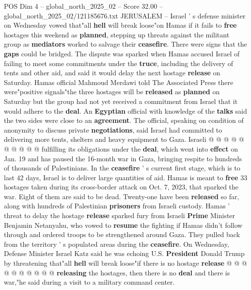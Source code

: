 \begin{textsample}{POS Dim 4 – global\_north\_2025\_02 – Score 32.00 – global\_north\_2025\_02/121185676.txt}  \label{ex:f4_pos_055}
JERUSALEM -- Israel ' s defense minister on Wednesday vowed that"all \textbf{hell} will break loose"on Hamas if it fails to \textbf{free} hostages this weekend as \textbf{planned}, stepping up threats against the militant group as \textbf{mediators} worked to salvage their \textbf{ceasefire}.
There were signs that the \textbf{gaps} could be bridged.
The dispute was sparked when Hamas accused Israel of failing to meet some commitments under the \textbf{truce}, including the delivery of tents and other aid, and said it would delay the next hostage \textbf{release} on Saturday.
Hamas official Mahmoud Merdawi told The Associated Press there were"positive signals"the three hostages will be \textbf{released} as \textbf{planned} on Saturday but the group had not yet received a commitment from Israel that it would adhere to the \textbf{deal}.
An \textbf{Egyptian} official with knowledge of the \textbf{talks} said the two sides were close to an \textbf{agreement}.
The official, speaking on condition of anonymity to discuss private \textbf{negotiations}, said Israel had committed to delivering more tents, shelters and heavy equipment to Gaza.
Israeli @ @ @ @ @ @ @ @ @ @ fulfilling its obligations under the \textbf{deal}, which went into \textbf{effect} on Jan. 19 and has paused the 16-month war in Gaza, bringing respite to hundreds of thousands of Palestinians.
In the \textbf{ceasefire} ' s current first stage, which is to last 42 days, Israel is to deliver large quantities of aid.
Hamas is meant to \textbf{free} 33 hostages taken during its cross-border attack on Oct. 7, 2023, that sparked the war.
Eight of them are said to be dead.
Twenty-one have been \textbf{released} so far, along with hundreds of Palestinian \textbf{prisoners} from Israeli custody.
Hamas ' threat to delay the hostage \textbf{release} sparked fury from Israeli \textbf{Prime} Minister Benjamin Netanyahu, who vowed to \textbf{resume} the fighting if Hamas didn't follow through and ordered troops to be strengthened around Gaza.
They pulled back from the territory ' s populated areas during the \textbf{ceasefire}.
On Wednesday, Defense Minister Israel Katz said he was echoing U.S. \textbf{President} Donald Trump by threatening that"all \textbf{hell} will break loose"if there is no hostage \textbf{release} @ @ @ @ @ @ @ @ @ @ \textbf{releasing} the hostages, then there is no \textbf{deal} and there is war,"he said during a visit to a military command center.

\end{textsample}
